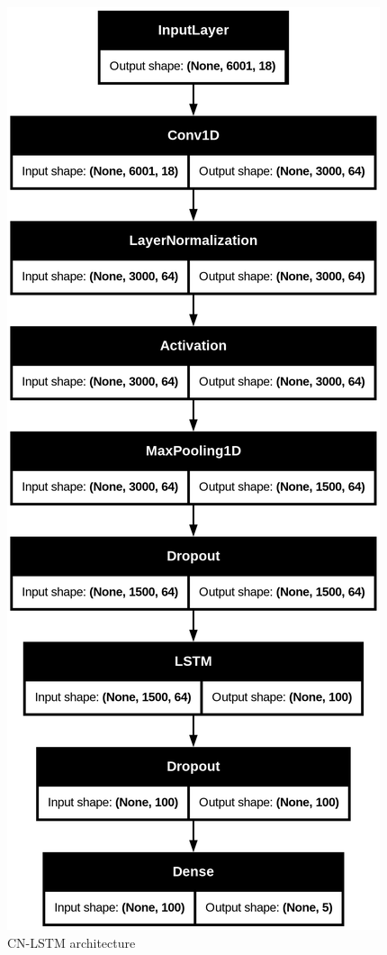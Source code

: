 \begin{figure}[H]
\centering
\includegraphics[scale=.1, angle=90]{figs/fcn-lstm.png}
\caption{CN-LSTM architecture}
\label{fig2}
\end{figure}

